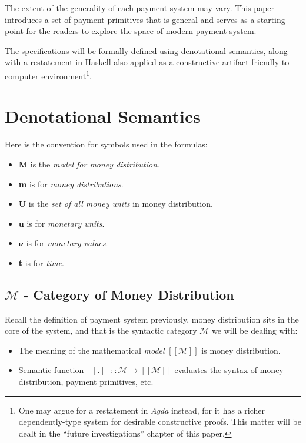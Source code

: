 The extent of the generality of each payment system may vary. This paper introduces a set of payment
primitives that is general and serves as a starting point for the readers to explore the space of
modern payment system.

The specifications will be formally defined using denotational semantics, along with a restatement
in Haskell also applied as a constructive artifact friendly to computer environment\footnote{One may
argue for a restatement in \textit{Agda} instead, for it has a richer dependently-type system for
desirable constructive proofs. This matter will be dealt in the ``future investigations'' chapter of
this paper.}.

\section{Denotational Semantics}

Here is the convention for symbols used in the formulas:

\begin{itemize}
\item \textbf{M} is the \textit{model for money distribution}.
\item \textbf{m} is for \textit{money distributions}.
\item \textbf{U} is the \textit{set of all money units} in money distribution.
\item \textbf{u} is for \textit{monetary units}.
\item $\boldsymbol{\nu}$ is for \textit{monetary values}.
\item \textbf{t} is for \textit{time}.
\end{itemize}

\subsection{$\mathcal{M}$ - Category of Money Distribution}

Recall the definition of payment system previously, money distribution sits in the core of the
system, and that is the syntactic category $\mathcal{M}$ we will be dealing with:

\begin{itemize}
    \item The meaning of the mathematical \textit{model} $[\![\mathcal{M}]\!]$ is money distribution.

    \item Semantic function $[\![.]\!] :: \mathcal{M} \rightarrow [\![\mathcal{M}]\!] $ evaluates
the syntax of money distribution, payment primitives, etc.
\end{itemize}

